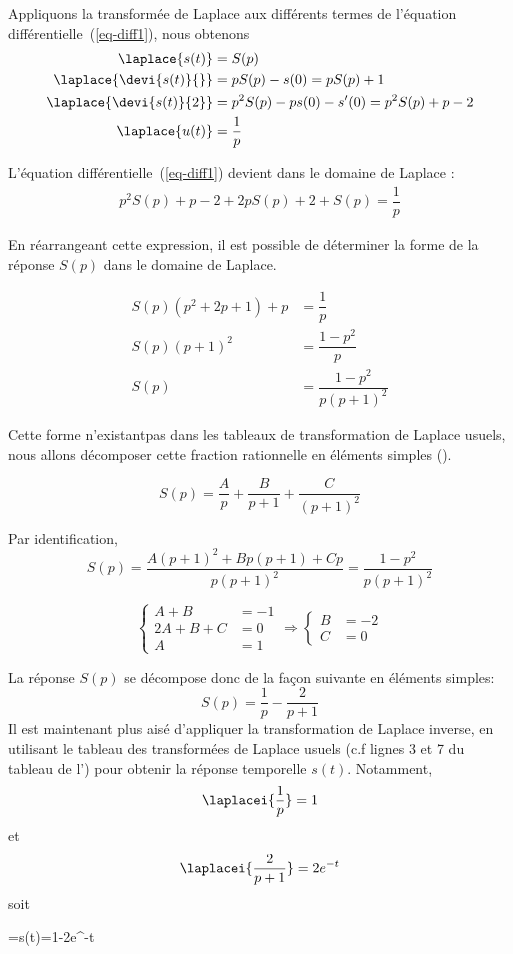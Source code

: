 Appliquons la transformée de Laplace aux différents termes de l'équation différentielle~(\ref{eq-diff1}),
nous obtenons
\begin{align*}
    \laplace{s(t)} &= S(p) \\
    \laplace{\devi{s(t)}{}} &= pS(p)-s(0) = pS(p) +1 \\
    \laplace{\devi{s(t)}{2}} &= p^2S(p)-ps(0)-s'(0) = p^2S(p) + p -2\\
    \laplace{u(t)} &= \dfrac{1}{p}
\end{align*}

L'équation différentielle~(\ref{eq-diff1}) devient dans le domaine de Laplace :
\begin{align*}
p^2S(p)+p-2+2pS(p)+2+S(p)=\dfrac{1}{p} 
\end{align*}

En réarrangeant cette expression, il est possible de déterminer la forme de la réponse 
$S(p)$ dans le domaine de Laplace.

\begin{align*}
    S(p)\left(p^2+2p+1\right)+p&=\dfrac{1}{p} \\
    S(p)\left(p+1\right)^2 &= \dfrac{1-p^2}{p}\\
    S(p)&= \dfrac{1-p^2}{p\left(p+1\right)^2}
\end{align*}

Cette forme \og n'existant\fg pas dans les tableaux de transformation de Laplace usuels, nous allons décomposer cette
fraction rationnelle en éléments simples ().

$$
S(p)=\dfrac{A}{p}+\dfrac{B}{p+1}+\dfrac{C}{(p+1)^2}
$$

Par identification, 
$$
S(p)=\dfrac{A(p+1)^2+Bp(p+1)+Cp}{p(p+1)^2}=\dfrac{1-p^2}{p\left(p+1\right)^2}
$$

$$
\begin{cases}
    A+B&=-1 \\
    2A+B+C&=0 \\
    A&=1   
\end{cases}\Rightarrow
\begin{cases}
    B&=-2\\
    C&=0
\end{cases}
$$

La réponse $S(p)$ se décompose donc de la façon suivante en éléments simples:
$$
S(p)=\dfrac{1}{p}-\dfrac{2}{p+1}
$$
Il est maintenant plus aisé d'appliquer la transformation de Laplace inverse, 
en utilisant le tableau des transformées de Laplace usuels (c.f lignes 3 et 7 du tableau de l') 
pour obtenir la réponse temporelle $s(t)$. Notamment,
$$
\laplacei{\dfrac{1}{p}}=1
$$
et
$$
\laplacei{\dfrac{2}{p+1}}=2e^{-t}
$$
soit 
\begin{bequation}
    =s(t)=1-2e^{-t}
\end{bequation}

